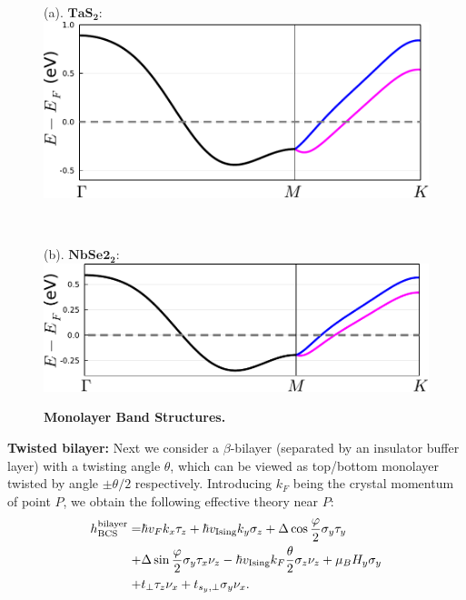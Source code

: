 \begin{figure}[!htp]
	\centering
	\begin{minipage}{0.9\linewidth}
		\RaggedRight (a). $\mathbf{TaS_2}$:\\[0.5em]
		\includegraphics[width=\textwidth]{contents/Ising_Top/figures/pdf_files/monolayer_band_Gamma_M_K_TaS2.pdf}
	\end{minipage}
	\\[2em]
	\begin{minipage}{0.9\linewidth}
		\RaggedRight (b). $\mathbf{NbSe2_2}$:\\[0.5em]
		\includegraphics[width=\textwidth]{contents/Ising_Top/figures/pdf_files/monolayer_band_Gamma_M_K_NbSe2.pdf}
	\end{minipage}
	\caption{{\bf Monolayer Band Structures.}}
	\label{fig: band_plot Gamma-M-K}
\end{figure}
\vspace{1em}\par
\textbf{Twisted bilayer:} Next we consider a $\beta$-bilayer (separated by an insulator buffer layer) with a twisting angle $\theta$, which can be viewed as top/bottom monolayer twisted by angle $\pm\theta/2$ respectively. Introducing $k_F$ being the crystal momentum of point $P$, we obtain the following effective theory near $P$:
\begin{align}
	h^{\text{bilayer}}_{\text{BCS}}= & \hbar v_F k_x\tau_z+\hbar v_{\text{Ising}} k_y\sigma_z+\Delta\cos\frac{\varphi}{2}\sigma_y\tau_y\notag                         \\
	+                                & \Delta\sin\frac{\varphi}{2} \sigma_y\tau_x\nu_z-\hbar v_{\text{Ising}}k_F\frac{\theta}{2}\sigma_z\nu_z+\mu_B H_y\sigma_y\notag \\
	+                                & t_\perp \tau_z\nu_x+t_{s_y,\perp}\sigma_y\nu_x.\label{eqn:bilayer_bcs}
\end{align}
